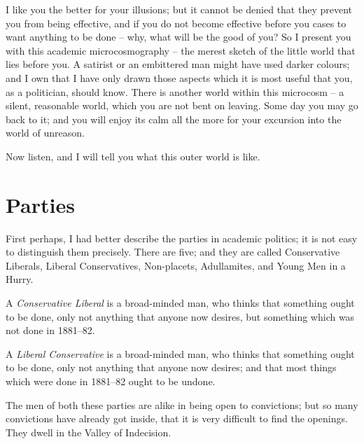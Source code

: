 \documentclass[12pt, oneside, b5paper]{memoir}
\begin{document}
I like you the better for your illusions; but it cannot be denied that they prevent you from being effective, and if you do not become effective before you cases to want anything to be done -- why, what will be the good of you? So I present you with this academic microcosmography -- the merest sketch of the little world that lies before you. A satirist or an embittered man might have used darker colours; and I own that I have only drawn those aspects which it is most useful that you, as a politician, should know. There is another world within this microcosm -- a silent, reasonable world, which you are not bent on leaving. Some day you may go back to it; and you will enjoy its calm all the more for your excursion into the world of unreason.

Now listen, and I will tell you what this outer world is like.

\chapter{Parties}

First perhaps, I had better describe the parties in academic politics; it is not easy to distinguish them precisely. There are five; and they are called Conservative Liberals, Liberal Conservatives, Non-placets, Adullamites, and Young Men in a Hurry.

A \textit{Conservative Liberal} is a broad-minded man, who thinks that something ought to be done, only not anything that anyone now desires, but something which was not done in 1881--82.

A \textit{Liberal Conservative} is a broad-minded man, who thinks that something ought to be done, only not anything that anyone now desires; and that most things which were done in 1881--82 ought to be undone.

The men of both these parties are alike in being open to convictions; but so many convictions have already got inside, that it is very difficult to find the openings. They dwell in the Valley of Indecision.
\end{document}
